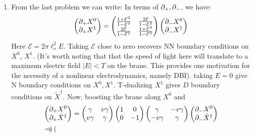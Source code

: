 \documentclass[11pt, class=article, crop=false]{standalone}
\begin{document}
\begin{enumerate}
	\item From the last problem we can write:
	In terms of $\partial_+, \partial_-$, we have:
		\begin{equation}\label{eq:electric}
		\begin{pmatrix}
			\partial_+ X^0\\
			\partial_+ X^1
		\end{pmatrix}=
			\begin{pmatrix}
				\frac{1+\mathcal E^2}{1- \mathcal E^2} & \frac{2\mathcal E}{1-\mathcal E^2}\\
				\frac{2\mathcal E}{1-\mathcal E^2} & \frac{1+\mathcal E^2}{1- \mathcal E^2}\\
			\end{pmatrix}
			\begin{pmatrix}
				\partial_- X^0\\
				\partial_- X^1
			\end{pmatrix}
		\end{equation}
		Here $\mathcal E = 2\pi \ell_s^2 E$. Taking $\mathcal E$ close to zero recovers NN boundary conditions on $X^0$, $X^1$.
		 (It's worth noting that that the speed of light here will translate to a maximum electric field $|E| < T$ on the brane. This provides one motivation for the necessity of a nonlinear electrodynamics, namely DBI). 
	 taking $E= 0$ give N boundary conditions on $X^0, X^1$. T-dualizing $X^1$ gives $D$ boundary conditions on $\tilde X^1$. Now, boosting the brane along $X^0$ and  
	\[
	\begin{aligned}
	&\begin{pmatrix}
		\partial_+ X^0\\
		\partial_+ \tilde X^1
	\end{pmatrix}=
		\begin{pmatrix}
			\gamma & v \gamma\\
			v \gamma & \gamma
		\end{pmatrix}
		\begin{pmatrix}
			1 & 0\\
			0 & -1
		\end{pmatrix}
		\begin{pmatrix}
			\gamma & -v \gamma\\
			-v \gamma & \gamma
		\end{pmatrix}
		\begin{pmatrix}
			\partial_- X^0\\
			\partial_- \tilde X^1
		\end{pmatrix}\\
		&\Rightarrow \begin{pmatrix}

\end{pmatrix}
\end{aligned}\]
\end{enumerate}
\end{document}

